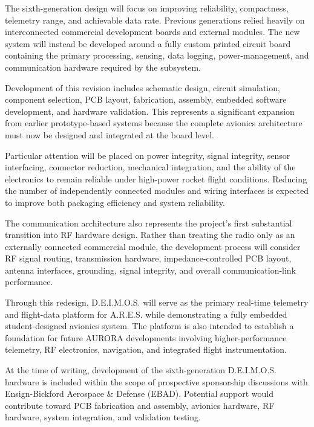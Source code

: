 \documentclass[11pt,twocolumn]{IEEEtran}
\newcommand{\ares}{A.R.E.S.}
\newcommand{\deimos}{D.E.I.M.O.S.}
\begin{document}
The sixth-generation design will focus on improving reliability, compactness, telemetry range, and achievable data rate. Previous generations relied heavily on interconnected commercial development boards and external modules. The new system will instead be developed around a fully custom printed circuit board containing the primary processing, sensing, data logging, power-management, and communication hardware required by the subsystem.

Development of this revision includes schematic design, circuit simulation, component selection, PCB layout, fabrication, assembly, embedded software development, and hardware validation. This represents a significant expansion from earlier prototype-based systems because the complete avionics architecture must now be designed and integrated at the board level.

Particular attention will be placed on power integrity, signal integrity, sensor interfacing, connector reduction, mechanical integration, and the ability of the electronics to remain reliable under high-power rocket flight conditions. Reducing the number of independently connected modules and wiring interfaces is expected to improve both packaging efficiency and system reliability.

The communication architecture also represents the project's first substantial transition into RF hardware design. Rather than treating the radio only as an externally connected commercial module, the development process will consider RF signal routing, transmission hardware, impedance-controlled PCB layout, antenna interfaces, grounding, signal integrity, and overall communication-link performance.

Through this redesign, \deimos{} will serve as the primary real-time telemetry and flight-data platform for \ares{} while demonstrating a fully embedded student-designed avionics system. The platform is also intended to establish a foundation for future AURORA developments involving higher-performance telemetry, RF electronics, navigation, and integrated flight instrumentation.

At the time of writing, development of the sixth-generation \deimos{} hardware is included within the scope of prospective sponsorship discussions with Ensign-Bickford Aerospace \& Defense (EBAD). Potential support would contribute toward PCB fabrication and assembly, avionics hardware, RF hardware, system integration, and validation testing.

\end{document}

